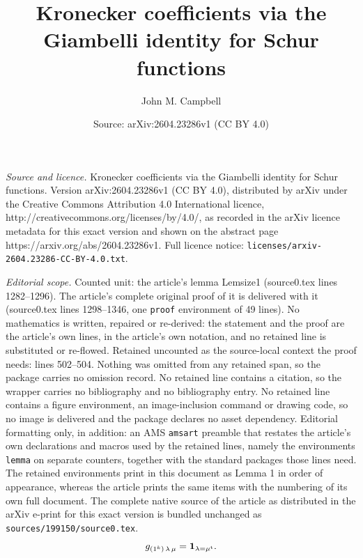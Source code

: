 \documentclass[10pt,a4paper]{amsart}
\title{Kronecker coefficients via the Giambelli identity for Schur functions}
\author{John M. Campbell}
\date{Source: arXiv:2604.23286v1 (CC BY 4.0)}
\begin{document}
\maketitle

\noindent\emph{Source and licence.} Kronecker coefficients via the Giambelli identity for Schur functions. Version arXiv:2604.23286v1 (CC BY 4.0), distributed by arXiv under the Creative Commons Attribution 4.0 International licence, http://creativecommons.org/licenses/by/4.0/, as recorded in the arXiv licence metadata for this exact version and shown on the abstract page https://arxiv.org/abs/2604.23286v1. Full licence notice: \texttt{licenses/arxiv-2604.23286-CC-BY-4.0.txt}.\par\smallskip

\noindent\textit{Editorial scope.} Counted unit: the article's lemma Lemsize1 (source0.tex lines 1282--1296). The article's complete original proof of it is delivered with it (source0.tex lines 1298--1346, one \texttt{proof} environment of 49 lines). No mathematics is written, repaired or re-derived: the statement and the proof are the article's own lines, in the article's own notation, and no retained line is substituted or re-flowed.  Retained uncounted as the source-local context the proof needs: lines 502--504.  Nothing was omitted from any retained span, so the package carries no omission record.  No retained line contains a citation, so the wrapper carries no bibliography and no bibliography entry.  No retained line contains a figure environment, an image-inclusion command or drawing code, so no image is delivered and the package declares no asset dependency.  Editorial formatting only, in addition: an AMS \texttt{amsart} preamble that restates the article's own declarations and macros used by the retained lines, namely the environments \texttt{lemma} on separate counters, together with the standard packages those lines need.  The retained environments print in this document as Lemma 1 in order of appearance, whereas the article prints the same items with the numbering of its own full document.  The complete native source of the article as distributed in the arXiv e-print for this exact version is bundled unchanged as \texttt{sources/199150/source0.tex}.
\begin{equation}\label{gsignrep}
 g_{(1^{k}) \, \lambda \, \mu} = \text{{\bf 1}}_{\lambda = \mu^{\operatorname{t}}}. 
\end{equation} 
\end{document}
